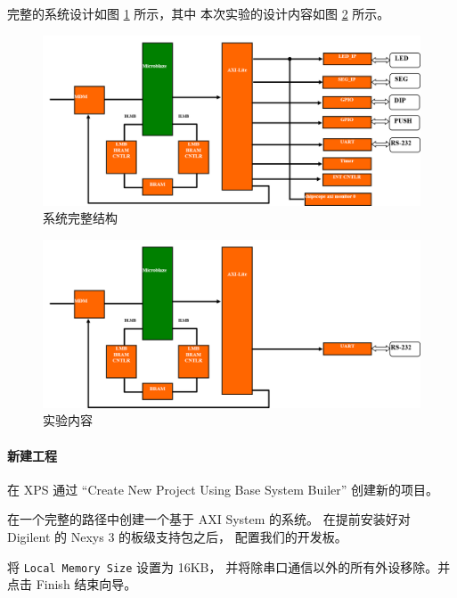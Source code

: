 \documentclass{ctexart}
\begin{document}
        完整的系统设计如图 \ref{fig:report3-1} 所示，其中
        本次实验的设计内容如图 \ref{fig:report3-2} 所示。
                
        \begin{figure}[h!]
\centering
\includegraphics[width=1\linewidth]{report3-1}
\caption{系统完整结构}
\label{fig:report3-1}
        \end{figure}
        
        \begin{figure}[h!]
\centering
\includegraphics[width=1\linewidth]{report3-2}
\caption{实验内容}
\label{fig:report3-2}
        \end{figure}
        
        \paragraph{新建工程}
        
        在 XPS 通过 “Create New Project Using Base System Builer” 创建新的项目。
        
        在一个完整的路径中创建一个基于 AXI System 的系统。
        在提前安装好对 Digilent 的 Nexys 3 的板级支持包之后，
        配置我们的开发板。
        
        将 \verb|Local Memory Size| 设置为 16KB，
        并将除串口通信以外的所有外设移除。并点击 Finish
        结束向导。
        
\end{document}

